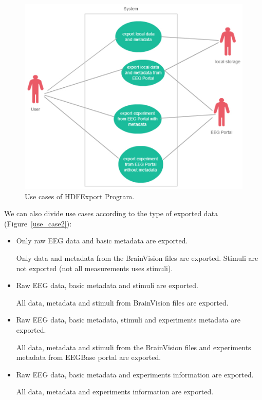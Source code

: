\documentclass[conference]{IEEEtran}
\begin{document}
\begin{figure}
	\includegraphics[scale=0.5]{obrazky/use_case_location.pdf}	
	\caption{Use cases of HDFExport Program.}
	\label{use_case1}
\end{figure}
We can also divide use cases according to the type of exported data (Figure~\ref{use_case2}):
\begin{itemize}
	\item Only raw EEG data and basic metadata are exported.
	
	Only data and metadata from the BrainVision files are exported. Stimuli are not exported (not all measurements uses stimuli).
	\item Raw EEG data, basic metadata and stimuli are exported.
	
	All data, metadata and stimuli from BrainVision files are exported.
	\item Raw EEG data, basic metadata, stimuli and experiments metadata are exported.
	
	All data, metadata and stimuli from the BrainVision files and experiments metadata from EEGBase portal are exported.
	\item Raw EEG data, basic metadata and experiments information are exported.
	
	All data, metadata and experiments information are exported.
\end{itemize}
\end{document}

